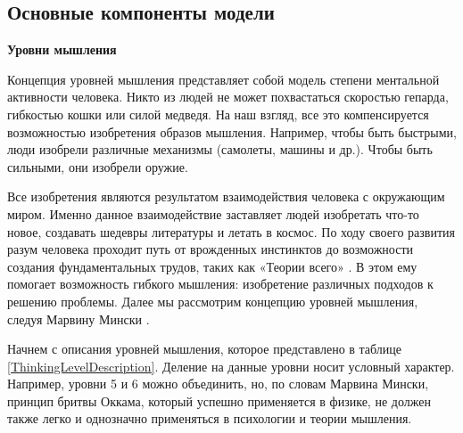 \subsection{Основные компоненты модели}
\textbf{Уровни мышления}\par
Концепция уровней мышления представляет собой модель степени ментальной активности человека. Никто из людей не может похвастаться скоростью гепарда, гибкостью кошки или силой медведя. На наш взгляд, все это компенсируется возможностью изобретения образов мышления. Например, чтобы быть быстрыми, люди изобрели различные механизмы (самолеты, машины и др.). Чтобы быть сильными, они изобрели оружие. \par
 Все изобретения являются результатом взаимодействия человека с окружающим миром. Именно данное взаимодействие заставляет людей изобретать что-то новое, создавать шедевры литературы и летать в космос. По ходу своего развития разум человека проходит путь от врожденных инстинктов до возможности создания фундаментальных трудов, таких как  «Теории всего» \cite{Hawking}. В этом ему помогает возможность гибкого мышления: изобретение различных подходов к решению проблемы. Далее мы рассмотрим концепцию уровней мышления, следуя Марвину Мински \cite{EmotionMachine}. \par
Начнем с описания уровней мышления, которое представлено в таблице \ref{ThinkingLevelDescription}. Деление на данные уровни носит условный характер. Например, уровни 5 и 6 можно объединить, но, по словам Марвина Мински, принцип бритвы Оккама, который успешно применяется в физике, не должен также легко и однозначно применяться в психологии и теории мышления. \par





